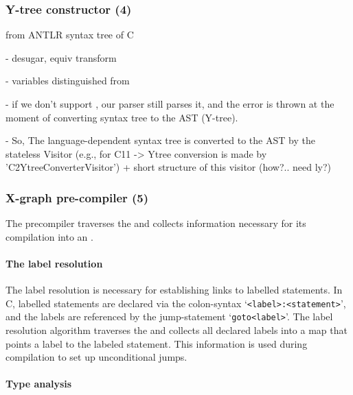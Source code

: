 \subsubsection{Y-tree constructor (4)}
\label{ch:impl:proc:y-constr}

from ANTLR syntax tree of C

- desugar, equiv transform

- variables distinguished from 

- if we don't support , our parser still parses it, and the error is thrown at the moment of converting syntax tree to the AST (Y-tree).

- So, The language-dependent syntax tree is converted to the AST by the stateless Visitor (e.g., for C11 -> Ytree conversion is made by 'C2YtreeConverterVisitor') + short structure of this visitor (how?.. need ly?)


\subsubsection{X-graph pre-compiler (5)}
\label{ch:impl:proc:x-pre-compiler}

The precompiler traverses the \ytree{} and collects information necessary for its compilation into an \xgraph{}.



\paragraph{The label resolution}
\label{ch:impl:proc:x-pre-compiler:label}


The label resolution is necessary for establishing links to labelled statements. %
In C, labelled statements are declared via the colon-syntax `\texttt{<label>\;:\;<statement>}', and the labels are referenced by the jump-statement `\texttt{goto\;<label>}'.
The label resolution algorithm traverses the \ytree{} and collects all declared labels into a map that points a label to the labeled statement. %
This information is used during compilation to set up unconditional jumps.


\paragraph{Type analysis}
\label{ch:impl:proc:x-pre-compiler:type}

